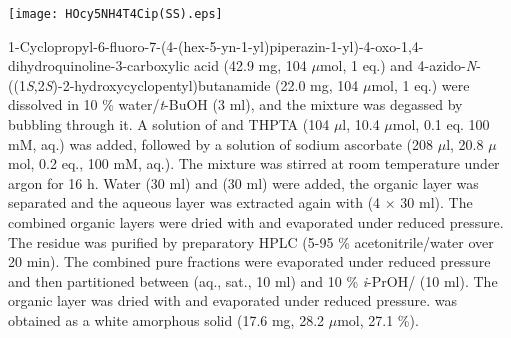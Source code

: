 
\begin{scheme}[H]
	\begin{center}
		\texttt{[image: HOcy5NH4T4Cip(SS).eps]}
	\end{center}
\end{scheme}

1-Cyclopropyl-6-fluoro-7-(4-(hex-5-yn-1-yl)piperazin-1-yl)-4-oxo-1,4\hyp{}dihydro\-quinoline-3-carboxylic acid  (42.9 mg, 104 $\mu$mol, 1 eq.) and 4\hyp{}azido\hyp{}\textit{N}\hyp{}((1\textit{S},2\textit{S})\hyp{}2\hyp{}hydroxycyclopentyl)butanamide  (22.0 mg, 104 $\mu$mol, 1 eq.) were dissolved in 10 \% water/\textit{t}-BuOH (3 ml), and the mixture was degassed by bubbling  through it. 
A solution of  and THPTA (104 $\mu$l, 10.4 $\mu$mol, 0.1 eq. 100 mM, aq.) was added, followed by a solution of sodium ascorbate (208 $\mu$l, 20.8 $\mu$mol, 0.2 eq., 100 mM, aq.). 
The mixture was stirred at room temperature under argon for 16 h. Water (30 ml) and  (30 ml) were added, the organic layer was separated and the aqueous layer was extracted again with  (4 $\times$ 30 ml). The combined organic layers were dried with  and evaporated under reduced pressure. The residue was purified by preparatory HPLC (5-95 \% acetonitrile/water over 20 min). The combined pure fractions were evaporated under reduced pressure and then partitioned between  (aq., sat., 10 ml) and 10 \% \textit{i}-PrOH/ (10 ml). The organic layer was dried with  and evaporated under reduced pressure.
 was obtained as a white amorphous solid (17.6 mg, 28.2 $\mu$mol, 27.1 \%).
\\[1\baselineskip]
\\[1\baselineskip]
